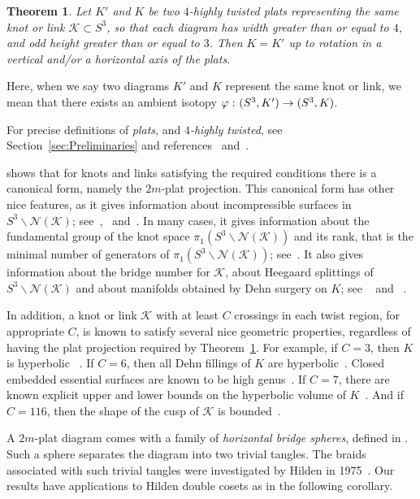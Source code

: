 \documentclass[12pt,reqno]{amsart}
\theoremstyle{plain}
\newtheorem{theorem}{Theorem}[section]
\theoremstyle{definition}
\def\from{\thinspace\colon}
\newcommand{\NN}{\mathcal{N}}
\newcommand{\ssm}{\smallsetminus}
\begin{document}
\begin{theorem}\label{thm:UniquePlat}
Let $K'$ and $K$ be two $4$-highly twisted plats 
representing the same knot or link $\mathcal{K} \subset S^3$, so that 
each diagram has width greater than or equal to $4$, and odd height greater 
than or  equal to $3$. Then $K=K'$ up to rotation in a 
vertical and/or a horizontal axis of the plats.
\end{theorem}

Here, when we say two diagrams $K'$ and $K$ represent the same knot or link, 
we mean that there exists an ambient isotopy $\varphi\from (S^3,K') \to (S^3,K)$.

For precise definitions of \emph{plats}, and \emph{$4$-highly twisted}, 
see Section~\ref{sec:Preliminaries} and references~\cite{BuZi} and~\cite{JM}.  

 shows that for knots and links satisfying the required
conditions there is a canonical form, namely the $2m$-plat projection. This 
canonical form has other nice features, as it gives
information about incompressible surfaces in $S^3 \ssm \NN(\mathcal{K})$;
see~\cite{FM1},~\cite{FM2} and~\cite{Wu}. In many cases, it gives information 
about the fundamental group of the knot space $\pi_1(S^3 \ssm \NN(\mathcal{K}))$ 
and its rank, that is the minimal
number of generators of $\pi_1(S^3 \ssm \NN(\mathcal{K}))$; see~\cite{LM}. 
It also gives information about the bridge number for $\mathcal{K}$, 
about Heegaard splittings of $S^3 \ssm \NN(\mathcal{K})$ and about manifolds 
obtained by Dehn surgery on $K$; see ~\cite{LM} and ~\cite{Wu}. 

In addition, a knot or link $\mathcal{K}$ with at least $C$ crossings in each 
twist region, for appropriate $C$, is known to satisfy several nice 
geometric properties, regardless of having the plat projection required by
Theorem~\ref{thm:UniquePlat}. For example, if $C=3$, then $K$ is hyperbolic 
~\cite{LMP,futer-purcell}. If $C=6$, then all Dehn fillings of $K$ are 
hyperbolic~\cite{futer-purcell}. 
Closed embedded essential surfaces are known to be high genus~\cite{BFT}. 
If $C=7$, there are known explicit upper and lower bounds on the hyperbolic 
volume of $K$~\cite{FKP}. And if $C=116$, then the shape of the cusp 
of $\mathcal{K}$ is bounded~\cite{purcell:cusps}. 

A $2m$-plat diagram comes with a family of \emph{horizontal bridge spheres}, defined 
in . Such a sphere separates the diagram into two trivial 
tangles. The braids associated with such trivial tangles were investigated by Hilden 
in 1975~\cite{Hilden}. Our results have applications to Hilden double cosets as in 
the following corollary. 
\end{document}
